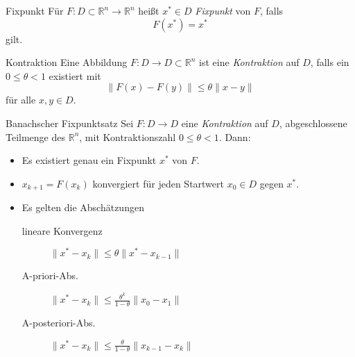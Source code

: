 
\begin{flashcard}[Definition]{Fixpunkt}
	Für $F : D \subset \mathbb{R}^n \rightarrow \mathbb{R}^n$ heißt $x^* \in D$ \emph{Fixpunkt} von $F$, falls
$$
	F(x^*) = x^*
$$
	gilt.
\end{flashcard}

\begin{flashcard}[Definition]{Kontraktion}
Eine Abbildung $F : D \rightarrow D \subset \mathbb{R}^n$ ist eine \emph{Kontraktion} auf $D$, falls ein $0 \leq \theta < 1$ existiert mit
$$
\| F(x) - F(y) \| \leq \theta \| x - y \|
$$
für alle $x, y \in D$.

\end{flashcard}

\begin{flashcard}[Satz]{Banachscher Fixpunktsatz}
Sei $F : D \rightarrow D$ eine \emph{Kontraktion} auf $D$, abgeschlossene Teilmenge des $\mathbb{R}^n$, mit Kontraktionszahl $0 \leq \theta < 1$.
Dann:

\begin{itemize}
	\item Es existiert genau ein Fixpunkt $x^*$ von $F$.
	\item $x_{k+1} = F(x_k)$ konvergiert für jeden Startwert $x_0 \in D$ gegen $x^*$.
	\item Es gelten die Abschätzungen
		\begin{description}
			\item[lineare Konvergenz] $\| x^* - x_k\| \leq \theta \|x^* - x_{k-1}\|$
			\item[A-priori-Abs.] $\| x^* - x_k\| \leq \frac{\theta^k}{1-\theta} \|x_0 - x_1\|$
			\item[A-posteriori-Abs.] $\| x^* - x_k\| \leq \frac{\theta}{1-\theta} \|x_{k-1} - x_k\|$
		\end{description}
\end{itemize}

\end{flashcard}
